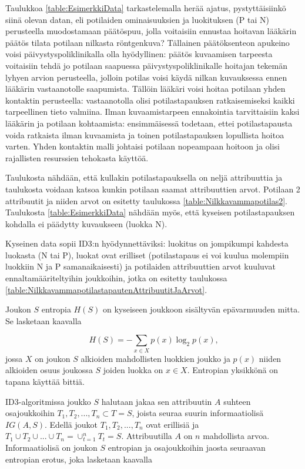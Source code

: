 \documentclass[12pt,finnish]{tktltiki2}
\theoremstyle{definition}
\theoremstyle{remark}
\begin{document}
Taulukkoa \ref{table:EsimerkkiData} tarkastelemalla herää ajatus, pystyttäisiinkö siinä olevan datan, eli potilaiden ominaisuuksien
ja luokituksen (P tai N) perusteella muodostamaan päätöspuu, jolla voitaisiin ennustaa hoitavan lääkärin päätös tilata potilaan nilkasta
röntgenkuva? Tällainen päätöksenteon apukeino voisi päivystyspoliklinikalla olla hyödyllinen:
päätös kuvaamisen tarpeesta voitaisiin tehdä jo potilaan saapuessa päivystyspoliklinikalle hoitajan tekemän
lyhyen arvion perusteella, jolloin potilas voisi käydä nilkan kuvauksessa ennen lääkärin vastaanotolle saapumista.
Tällöin lääkäri voisi hoitaa potilaan yhden kontaktin perusteella: vastaanotolla olisi potilastapauksen ratkaisemiseksi
kaikki tarpeellinen tieto valmiina. Ilman kuvaamistarpeen ennakointia tarvittaisiin kaksi lääkärin ja potilaan
kohtaamista: ensimmäisessä todetaan, ettei potilastapausta voida ratkaista ilman kuvaamista ja toinen potilastapauksen
lopullista hoitoa varten. Yhden kontaktin malli johtaisi potilaan nopeampaan hoitoon ja olisi rajallisten resurssien
tehokasta käyttöä.

Taulukosta nähdään, että kullakin potilastapauksella on neljä attribuuttia ja taulukosta voidaan katsoa kunkin potilaan
saamat attribuuttien arvot. Potilaan 2 attribuutit ja niiden arvot on esitetty taulukossa \ref{table:Nilkkavammapotilas2}.
Taulukosta \ref{table:EsimerkkiData} nähdään myös, että kyseisen potilastapauksen kohdalla ei päädytty kuvaukseen (luokka N).

Kyseinen data sopii ID3:n hyödynnettäviksi: luokitus on jompikumpi kahdesta luokasta (N tai P), luokat ovat erilliset (potilastapaus
ei voi kuulua molempiin luokkiin N ja P samanaikaisesti) ja potilaiden attribuuttien arvot kuuluvat ennaltamääriteltyihin joukkoihin,
jotka on esitetty taulukossa \ref{table:NilkkavammapotilastapautenAttribuutitJaArvot}.

Joukon $S$ entropia $H(S)$ on kyseiseen joukkoon sisältyvän epävarmuuden mitta. Se lasketaan
kaavalla

\[ H(S) = -\sum_{x \in X} p(x)\log_2 p(x) \mbox{,}\]
jossa $X$ on joukon $S$ alkioiden mahdollisten luokkien joukko ja $p(x)$ niiden alkioiden osuus
joukossa $S$ joiden luokka on $x \in X$. Entropian yksikkönä on tapana käyttää bittiä.

ID3-algoritmissa joukko $S$ halutaan jakaa sen attribuutin $A$ suhteen osajoukkoihin
$T_1, T_2, ..., T_n \subset T = S$, joista seuraa suurin informaatiolisä $IG(A,S)$.
Edellä joukot $T_1, T_2, ..., T_n$ ovat erillisiä ja 
$T_1\cup T_2\cup ...\cup T_n = \cup_{t=1}^{n}T_t = S$.
Attribuutilla $A$
on $n$ mahdollista arvoa. Informaatiolisä on joukon $S$ entropian ja osajoukkoihin jaosta seuraavan
entropian erotus, joka lasketaan kaavalla
\end{document}
